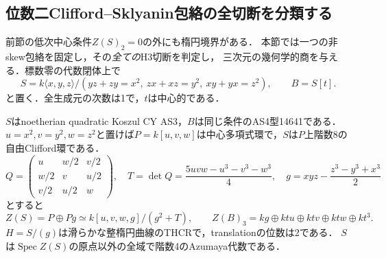 \subsection{位数二Clifford--Sklyanin包絡の全切断を分類する}
\label{sec:clifford-all-cuts}
前節の低次中心条件$Z(S)_2=0$の外にも楕円境界がある．
本節では一つの非skew包絡を固定し，その\emph{全ての}H3切断を判定し，
三次元の幾何学的商を与える．標数零の代数閉体上で
\[
 S=k\langle x,y,z\rangle/(yz+zy=x^2,\ zx+xz=y^2,\ xy+yx=z^2),\qquad B=S[t].
\]
と置く．全生成元の次数は1で，$t$は中心的である．

\begin{lemma}
\label{lem:clifford-center-azumaya}
$S$はnoetherian quadratic Koszul CY AS3，$B$は同じ条件のAS4型14641である．
$u=x^2,v=y^2,w=z^2$と置けば$P=k[u,v,w]$は中心多項式環で，$S$は$P$上階数8の自由Clifford環である．
\[
 Q=\begin{pmatrix}u&w/2&v/2\\w/2&v&u/2\\v/2&u/2&w\end{pmatrix},\quad
 T=\det Q=\frac{5uvw-u^3-v^3-w^3}{4},\quad
 g=xyz-\frac{z^3-y^3+x^3}{2}
\]
とすると
\[
 Z(S)=P\oplus Pg\simeq k[u,v,w,g]/(g^2+T),\qquad
 Z(B)_3=kg\oplus kt u\oplus kt v\oplus kt w\oplus kt^3.
\]
$H=S/(g)$は滑らかな整楕円曲線のTHCRで，translationの位数は2である．
$S$は$\operatorname{Spec}Z(S)$の原点以外の全域で階数4のAzumaya代数である．
\end{lemma}
